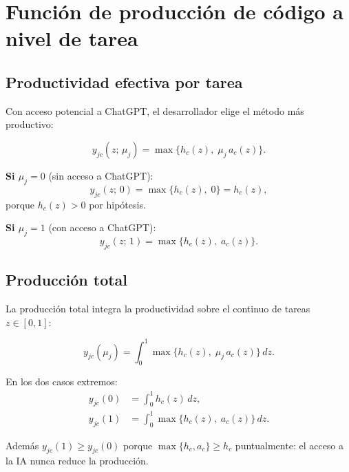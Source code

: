 \documentclass[11pt, a4paper]{article}
\begin{document}
\bigskip

\section{Funci\'on de producci\'on de c\'odigo a nivel de tarea}

\subsection{Productividad efectiva por tarea}

Con acceso potencial a ChatGPT, el desarrollador elige el m\'etodo m\'as productivo:

\begin{demobox}
\begin{equation}
  y_{jc}(z;\,\mu_j) = \max\!\bigl\{h_c(z),\; \mu_j\, a_c(z)\bigr\}.
\end{equation}

\textbf{Si $\mu_j = 0$} (sin acceso a ChatGPT):
\begin{equation}
  y_{jc}(z;\,0) = \max\!\bigl\{h_c(z),\;0\bigr\} = h_c(z),
\end{equation}
porque $h_c(z) > 0$ por hip\'otesis.

\textbf{Si $\mu_j = 1$} (con acceso a ChatGPT):
\begin{equation}
  y_{jc}(z;\,1) = \max\!\bigl\{h_c(z),\;a_c(z)\bigr\}.
\end{equation}
\end{demobox}

\subsection{Producci\'on total}

La producci\'on total integra la productividad sobre el continuo de tareas $z \in [0,1]$:

\begin{demobox}
\begin{equation}
  y_{jc}(\mu_j) = \int_0^1 \max\!\bigl\{h_c(z),\;\mu_j\,a_c(z)\bigr\}\,dz.
\end{equation}

En los dos casos extremos:
\begin{align}
  y_{jc}(0) &= \int_0^1 h_c(z)\,dz, \\
  y_{jc}(1) &= \int_0^1 \max\!\bigl\{h_c(z),\;a_c(z)\bigr\}\,dz.
\end{align}

Adem\'as $y_{jc}(1) \ge y_{jc}(0)$ porque $\max\{h_c,a_c\} \ge h_c$ puntualmente: el
acceso a la IA nunca reduce la producci\'on.
\end{demobox}
\end{document}
